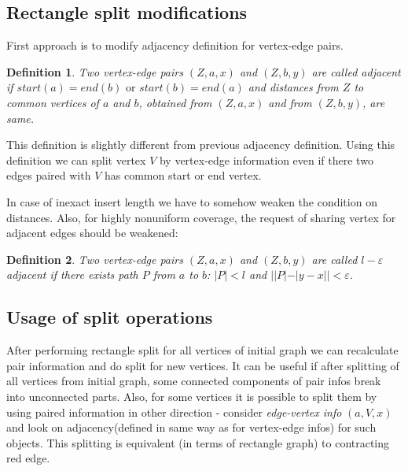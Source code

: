 \documentclass[12pt,a4paper,oneside]{article}
\newtheorem{definition}{Definition}
\def\eps{\varepsilon}
\begin{document}
\subsection{Rectangle split modifications}
First approach is to modify adjacency definition for vertex-edge pairs.
\begin{definition}
 Two vertex-edge pairs $(Z,a,x)$ and $(Z,b,y)$ are called \emph{adjacent} if $ start (a) = end(b)\text{ or } start(b) = end (a)$ and distances from $Z$ to common vertices of $a$ and $b$, obtained from $(Z,a,x)$ and from $(Z,b,y)$, are same. 
\end{definition}
This definition  is slightly different from previous adjacency definition. Using this definition we can split vertex $V$ by vertex-edge information even if there two edges paired with $V$ has common start or end vertex.   

In case of inexact insert length we have to somehow weaken the condition on distances.
Also, for highly nonuniform coverage, the request of sharing vertex for adjacent edges should be weakened:

\begin{definition}
 Two vertex-edge pairs $(Z,a,x)$ and $(Z,b,y)$ are called \emph{$l-\eps$ adjacent} if there exists path $P$ from $a$ to $b$: $|P|<l$ and $||P| - |y-x|| < \eps$.   
\end{definition}

\subsection{Usage of split operations}

After performing rectangle split for all vertices of initial graph we can recalculate pair information and do split for new vertices. It can be useful if after splitting of all vertices from initial graph, some connected components of pair infos break into unconnected parts. 
Also, for some vertices it is possible to split them by using paired information in other direction - consider \emph{edge-vertex info} $(a, V, x)$ and look on adjacency(defined in same way as for vertex-edge infos) for such objects. This splitting is equivalent (in terms of rectangle graph) to contracting red edge. 

\end{document}
